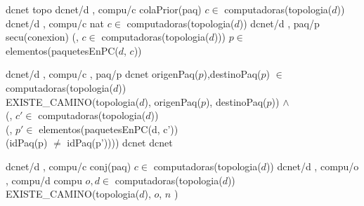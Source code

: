 \begin{tad}{}


\tadObservadores
	 {dcnet} {topo} {}
	 {dcnet/d , compu/c} {colaPrior(paq)} {$c\in$ computadoras(topologia($d$))}
	 {dcnet/d , compu/c} {nat} {$c\in$ computadoras(topologia($d$))} 
	 {dcnet/d , paq/p} {secu(conexion)} {(, $c \in$ computadoras(topologia($d$))) $p\in$ elementos(paquetesEnPC($d$, $c$))}

\tadGeneradores
 	 {dcnet/d , compu/c , paq/p} {dcnet} {origenPaq($p$),destinoPaq($p$) $\in$ computadoras(topologia($d$)) \yluego\\
  EXISTE\_CAMINO(topologia($d$), origenPaq($p$), destinoPaq($p$)) $\land$ \\
  (, $c' \in$ computadoras(topologia($d$))\\
  \hspace*{3em}(, $p' \in$ elementos(paquetesEnPC(d, c'))\\
  \hspace*{6em}(idPaq(p) $\neq$ idPaq(p'))))}
	 {dcnet} {dcnet} {}

\tadOtrasOperaciones
{}
	 {dcnet/d , compu/c} {conj(paq)} {$c\in$ computadoras(topologia($d$))}
   {dcnet/d , compu/o , compu/d} {compu} {$o,d \in$ computadoras(topologia($d$)) \yluego EXISTE\_CAMINO(topologia($d$), $o$, $n$ )}
		


\end{tad}
